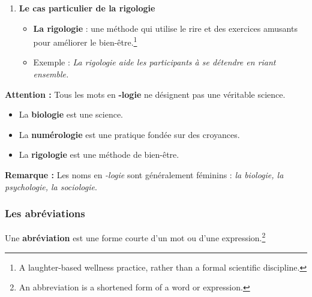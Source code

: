 \documentclass[math,code]{amznotes}
\theoremstyle{remark}
\begin{document}
\begin{enumerate}
    \item \textbf{Le cas particulier de la rigologie}
    \begin{itemize}
        \item \textbf{La rigologie} : une méthode qui utilise le rire et des exercices amusants pour améliorer le bien-être.\footnote{A laughter-based wellness practice, rather than a formal scientific discipline.}
        \item Exemple : \textit{La rigologie aide les participants à se détendre en riant ensemble.}
    \end{itemize}
\end{enumerate}

\begin{notebox}
\textbf{Attention :} Tous les mots en \textbf{-logie} ne désignent pas une véritable science.

\begin{itemize}
    \item La \textbf{biologie} est une science.
    \item La \textbf{numérologie} est une pratique fondée sur des croyances.
    \item La \textbf{rigologie} est une méthode de bien-être.
\end{itemize}

\textbf{Remarque :} Les noms en \textit{-logie} sont généralement féminins : \textit{la biologie, la psychologie, la sociologie}.
\end{notebox}

\subsubsection*{Les abréviations}

Une \textbf{abréviation} est une forme courte d'un mot ou d'une expression.\footnote{An abbreviation is a shortened form of a word or expression.}
\end{document}
